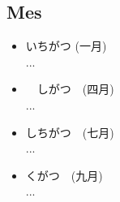 \documentclass[a4paper, 12pt]{article}
\begin{document}
\subsection{Mes}
	\begin{CJK}{UTF8}{min}
		\begin{itemize}
			\item いちがつ (一月)\\...
			\item　しがつ　(四月)\\...
			\item しちがつ　(七月)\\...
			\item くがつ　(九月)\\...
		\end{itemize}
		
	\end{CJK}
\end{document}
